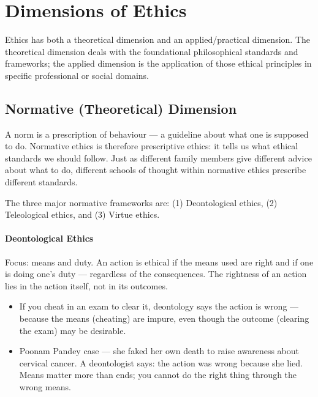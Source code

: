 \section{Dimensions of Ethics}

Ethics has both a theoretical dimension and an applied/practical dimension. The theoretical dimension deals with the foundational philosophical standards and frameworks; the applied dimension is the application of those ethical principles in specific professional or social domains.

\subsection{Normative (Theoretical) Dimension}

A norm is a prescription of behaviour --- a guideline about what one is supposed to do. Normative ethics is therefore prescriptive ethics: it tells us what ethical standards we should follow. Just as different family members give different advice about what to do, different schools of thought within normative ethics prescribe different standards.

\begin{KeyConcept}
The three major normative frameworks are: (1) Deontological ethics, (2) Teleological ethics, and (3) Virtue ethics.
\end{KeyConcept}

\paragraph{Deontological Ethics} Focus: means and duty. An action is ethical if the means used are right and if one is doing one's duty --- regardless of the consequences. The rightness of an action lies in the action itself, not in its outcomes.

\begin{ExampleBox}
\begin{itemize}
\item If you cheat in an exam to clear it, deontology says the action is wrong --- because the means (cheating) are impure, even though the outcome (clearing the exam) may be desirable.
\item Poonam Pandey case --- she faked her own death to raise awareness about cervical cancer. A deontologist says: the action was wrong because she lied. Means matter more than ends; you cannot do the right thing through the wrong means.
\end{itemize}
\end{ExampleBox}


